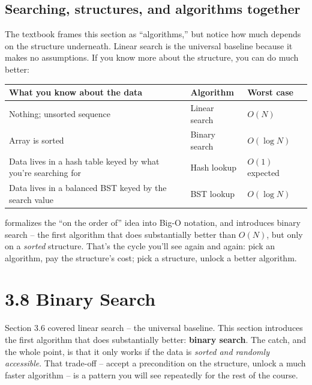 \documentclass[11pt]{article}
\begin{document}
\subsection{Searching, structures, and algorithms together}

The textbook frames this section as ``algorithms,'' but notice how
much depends on the structure underneath. Linear search is the
universal baseline because it makes no assumptions. If you know more
about the structure, you can do much better:

\begin{center}
\footnotesize
\renewcommand{\arraystretch}{1.25}
\begin{tabular}{@{}p{5.5cm}p{4.5cm}p{2.8cm}@{}}
\hline
\textbf{What you know about the data} & \textbf{Algorithm} & \textbf{Worst case} \\
\hline
Nothing; unsorted sequence                & Linear search      & $O(N)$ \\
Array is sorted                           & Binary search      & $O(\log N)$ \\
Data lives in a hash table keyed by what you're searching for & Hash lookup & $O(1)$ expected \\
Data lives in a balanced BST keyed by the search value & BST lookup & $O(\log N)$ \\
\hline
\end{tabular}
\end{center}

\begin{notebox}
 formalizes the ``on the order of'' idea into Big-O
notation, and  introduces binary search -- the first
algorithm that does substantially better than $O(N)$, but only on a
\emph{sorted} structure. That's the cycle you'll see again and again:
pick an algorithm, pay the structure's cost; pick a structure, unlock
a better algorithm.
\end{notebox}

\section{3.8 Binary Search}

Section 3.6 covered linear search -- the universal baseline. This
section introduces the first algorithm that does substantially better:
\textbf{binary search}. The catch, and the whole point, is that it
only works if the data is \emph{sorted and randomly accessible}. That
trade-off -- accept a precondition on the structure, unlock a much
faster algorithm -- is a pattern you will see repeatedly for the
rest of the course.
\end{document}
